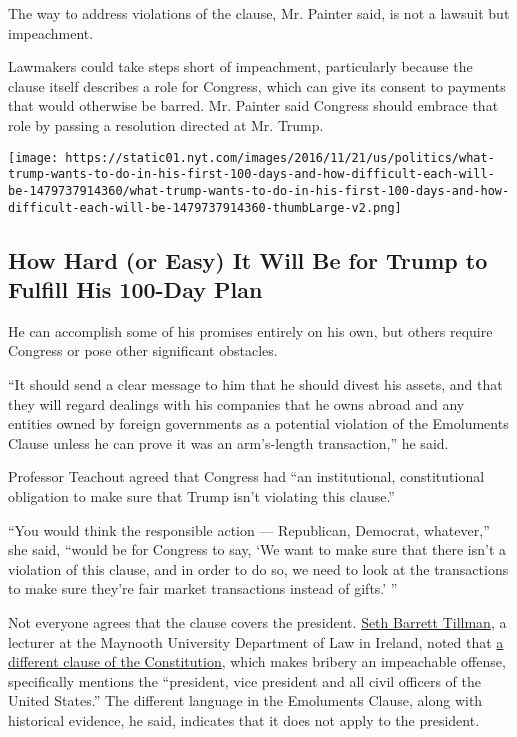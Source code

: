 The way to address violations of the clause, Mr. Painter said, is not a
lawsuit but impeachment.

Lawmakers could take steps short of impeachment, particularly because
the clause itself describes a role for Congress, which can give its
consent to payments that would otherwise be barred. Mr. Painter said
Congress should embrace that role by passing a resolution directed at
Mr. Trump.

\href{https://www.nytimes.com/interactive/2016/11/21/us/politics/what-trump-wants-to-do-in-his-first-100-days-and-how-difficult-each-will-be.html}{}

\texttt{[image: https://static01.nyt.com/images/2016/11/21/us/politics/what-trump-wants-to-do-in-his-first-100-days-and-how-difficult-each-will-be-1479737914360/what-trump-wants-to-do-in-his-first-100-days-and-how-difficult-each-will-be-1479737914360-thumbLarge-v2.png]}

\hypertarget{how-hard-or-easy-it-will-be-for-trump-to-fulfill-his-100-day-plan}{%
\subsection{How Hard (or Easy) It Will Be for Trump to Fulfill His
100-Day
Plan}\label{how-hard-or-easy-it-will-be-for-trump-to-fulfill-his-100-day-plan}}

He can accomplish some of his promises entirely on his own, but others
require Congress or pose other significant obstacles.

``It should send a clear message to him that he should divest his
assets, and that they will regard dealings with his companies that he
owns abroad and any entities owned by foreign governments as a potential
violation of the Emoluments Clause unless he can prove it was an
arm's-length transaction,'' he said.

Professor Teachout agreed that Congress had ``an institutional,
constitutional obligation to make sure that Trump isn't violating this
clause.''

``You would think the responsible action --- Republican, Democrat,
whatever,'' she said, ``would be for Congress to say, `We want to make
sure that there isn't a violation of this clause, and in order to do so,
we need to look at the transactions to make sure they're fair market
transactions instead of gifts.' ''

Not everyone agrees that the clause covers the president.
\href{https://www.maynoothuniversity.ie/people/seth-barrett-tillman}{Seth
Barrett Tillman}, a lecturer at the Maynooth University Department of
Law in Ireland, noted that
\href{http://press-pubs.uchicago.edu/founders/tocs/a1_2_5.html}{a
different clause of the Constitution}, which makes bribery an
impeachable offense, specifically mentions the ``president, vice
president and all civil officers of the United States.'' The different
language in the Emoluments Clause, along with historical evidence, he
said, indicates that it does not apply to the president.

